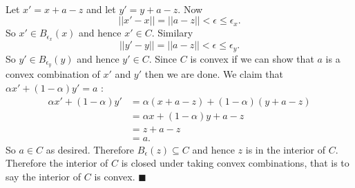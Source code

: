 \documentclass[letterpaper,12pt,oneside,onecolumn]{article}
\begin{document}
\paragraph{}
Let $x' = x + a-z$ and let $y' = y + a - z$. Now $$||x' - x|| = ||a-z|| < \epsilon \leq \epsilon_x.$$ So $x' \in B_{\epsilon_x}(x)$ and hence $x' \in C$. Similary $$||y'-y|| = ||a-z|| < \epsilon \leq \epsilon_y.$$ So $y' \in B_{\epsilon_y}(y)$ and hence $y' \in C$. Since $C$ is convex if we can show that $a$ is a convex combination of $x'$ and $y'$ then we are done. We claim that $\alpha x' + (1-\alpha)y' = a$ :
\begin{align*}
\alpha x' + (1-\alpha)y' &= \alpha(x + a - z) + (1-\alpha)(y+a-z) \\
&= \alpha x + (1-\alpha)y + a - z \\
&= z + a -z \\
&= a.
\end{align*}
So $a \in C$ as desired. Therefore $B_\epsilon(z) \subseteq C$ and hence $z$ is in the interior of $C$. Therefore the interior of $C$ is closed under taking convex combinations, that is to say the interior of $C$ is convex. $\blacksquare$
\end{document}
